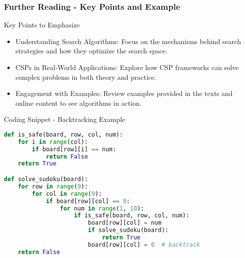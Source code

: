 \documentclass[aspectratio=169]{beamer}
\begin{document}
\begin{frame}[fragile]
    \frametitle{Further Reading - Key Points and Example}
    \begin{block}{Key Points to Emphasize}
        \begin{itemize}
            \item Understanding Search Algorithms: Focus on the mechanisms behind search strategies and how they optimize the search space.
            \item CSPs in Real-World Applications: Explore how CSP frameworks can solve complex problems in both theory and practice.
            \item Engagement with Examples: Review examples provided in the texts and online content to see algorithms in action.
        \end{itemize}
    \end{block}

    \begin{block}{Coding Snippet - Backtracking Example}
    \begin{lstlisting}[language=Python]
def is_safe(board, row, col, num):
    for i in range(col):
        if board[row][i] == num:
            return False
    return True

def solve_sudoku(board):
    for row in range(9):
        for col in range(9):
            if board[row][col] == 0:
                for num in range(1, 10):
                    if is_safe(board, row, col, num):
                        board[row][col] = num
                        if solve_sudoku(board):
                            return True
                        board[row][col] = 0  # backtrack
    return False
    \end{lstlisting}
    \end{block}
\end{frame}
\end{document}

